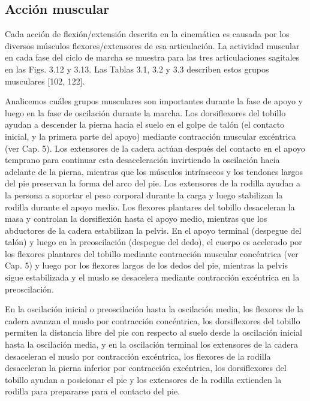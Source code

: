\documentclass[12pt]{book}
\begin{document}
\subsection{Acción muscular}

Cada acción de flexión/extensión descrita en la cinemática es causada por los diversos músculos flexores/extensores de esa articulación. La actividad muscular en cada fase del ciclo de marcha se muestra para las tres articulaciones sagitales en las Figs. 3.12 y 3.13. Las Tablas 3.1, 3.2 y 3.3 describen estos grupos musculares [102, 122].

Analicemos cuáles grupos musculares son importantes durante la fase de apoyo y luego en la fase de oscilación durante la marcha. Los dorsiflexores del tobillo ayudan a descender la pierna hacia el suelo en el golpe de talón (el contacto inicial, y la primera parte del apoyo) mediante contracción muscular excéntrica (ver Cap. 5). Los extensores de la cadera actúan después del contacto en el apoyo temprano para continuar esta desaceleración invirtiendo la oscilación hacia adelante de la pierna, mientras que los músculos intrínsecos y los tendones largos del pie preservan la forma del arco del pie. Los extensores de la rodilla ayudan a la persona a soportar el peso corporal durante la carga y luego stabilizan la rodilla durante el apoyo medio. Los flexores plantares del tobillo desaceleran la masa y controlan la dorsiflexión hasta el apoyo medio, mientras que los abductores de la cadera estabilizan la pelvis. En el apoyo terminal (despegue del talón) y luego en la preoscilación (despegue del dedo), el cuerpo es acelerado por los flexores plantares del tobillo mediante contracción muscular concéntrica (ver Cap. 5) y luego por los flexores largos de los dedos del pie, mientras la pelvis sigue estabilizada y el muslo se desacelera mediante contracción excéntrica en la preoscilación.

En la oscilación inicial o preoscilación hasta la oscilación media, los flexores de la cadera avanzan el muslo por contracción concéntrica, los dorsiflexores del tobillo permiten la distancia libre del pie con respecto al suelo desde la oscilación inicial hasta la oscilación media, y en la oscilación terminal los extensores de la cadera desaceleran el muslo por contracción excéntrica, los flexores de la rodilla desaceleran la pierna inferior por contracción excéntrica, los dorsiflexores del tobillo ayudan a posicionar el pie y los extensores de la rodilla extienden la rodilla para prepararse para el contacto del pie.
\end{document}
